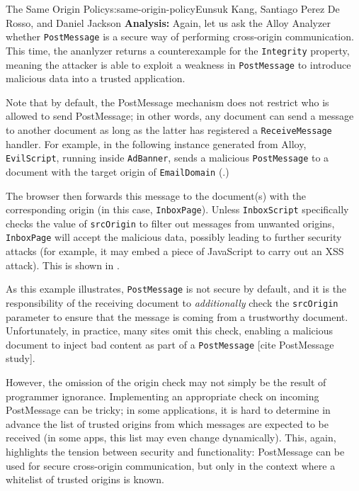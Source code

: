 \begin{aosachapter}{The Same Origin Policy}{s:same-origin-policy}{Eunsuk Kang, Santiago Perez De Rosso, and Daniel Jackson}
\textbf{Analysis:} Again, let us ask the Alloy Analyzer whether
\texttt{PostMessage} is a secure way of performing cross-origin
communication. This time, the ananlyzer returns a counterexample for the
\texttt{Integrity} property, meaning the attacker is able to exploit a
weakness in \texttt{PostMessage} to introduce malicious data into a
trusted application.

Note that by default, the PostMessage mechanism does not restrict who is
allowed to send PostMessage; in other words, any document can send a
message to another document as long as the latter has registered a
\texttt{ReceiveMessage} handler. For example, in the following instance
generated from Alloy, \texttt{EvilScript}, running inside
\texttt{AdBanner}, sends a malicious \texttt{PostMessage} to a document
with the target origin of \texttt{EmailDomain}
(.)


The browser then forwards this message to the document(s) with the
corresponding origin (in this case, \texttt{InboxPage}). Unless
\texttt{InboxScript} specifically checks the value of \texttt{srcOrigin}
to filter out messages from unwanted origins, \texttt{InboxPage} will
accept the malicious data, possibly leading to further security attacks
(for example, it may embed a piece of JavaScript to carry out an XSS
attack). This is shown in
.


As this example illustrates, \texttt{PostMessage} is not secure by
default, and it is the responsibility of the receiving document to
\emph{additionally} check the \texttt{srcOrigin} parameter to ensure
that the message is coming from a trustworthy document. Unfortunately,
in practice, many sites omit this check, enabling a malicious document
to inject bad content as part of a \texttt{PostMessage} {[}cite
PostMessage study{]}.

However, the omission of the origin check may not simply be the result
of programmer ignorance. Implementing an appropriate check on incoming
PostMessage can be tricky; in some applications, it is hard to determine
in advance the list of trusted origins from which messages are expected
to be received (in some apps, this list may even change dynamically).
This, again, highlights the tension between security and functionality:
PostMessage can be used for secure cross-origin communication, but only
in the context where a whitelist of trusted origins is known.


\end{aosachapter}
